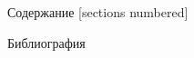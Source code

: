 \documentclass[10pt, aspectratio=169, handout]{beamer}
\theoremstyle{newblock}
\theoremstyle{newblock}
\theoremstyle{newblock}
\begin{document}
\maketitle

\begin{frame}{Содержание}
    [sections numbered]
    \tableofcontents%
\end{frame}
  

  
\begin{frame}[allowframebreaks]{Библиография}
    \printbibliography
\end{frame}
\end{document}
